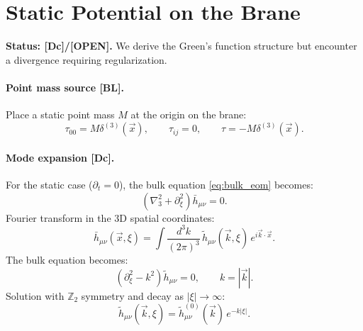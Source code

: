 \documentclass[11pt,a4paper]{article}
\newcommand{\tagBL}{\textcolor{blue!70!black}{[BL]}}
\newcommand{\tagOPEN}{\textcolor{red!70!black}{[OPEN]}}
\newcommand{\tagDc}{\textcolor{purple!70!black}{[Dc]}}
\begin{document}
\section{Static Potential on the Brane}
\label{sec:potential}

\begin{statusbox}
\textbf{Status: \tagDc{}/\tagOPEN{}.}
We derive the Green's function structure but encounter a divergence requiring regularization.
\end{statusbox}

\paragraph{Point mass source \tagBL{}.}
Place a static point mass $M$ at the origin on the brane:
\begin{equation}
    \tau_{00} = M \delta^{(3)}(\vec{x}), \qquad \tau_{ij} = 0, \qquad \tau = -M \delta^{(3)}(\vec{x}).
    \label{eq:source}
\end{equation}

\paragraph{Mode expansion \tagDc{}.}
For the static case ($\partial_t = 0$), the bulk equation \eqref{eq:bulk_eom} becomes:
\begin{equation}
    \left( \nabla^2_3 + \partial_\xi^2 \right) \bar{h}_{\mu\nu} = 0.
    \label{eq:static_bulk}
\end{equation}
Fourier transform in the 3D spatial coordinates:
\begin{equation}
    \bar{h}_{\mu\nu}(\vec{x}, \xi) = \int \frac{d^3k}{(2\pi)^3} \, \tilde{h}_{\mu\nu}(\vec{k}, \xi) \, e^{i\vec{k}\cdot\vec{x}}.
\end{equation}
The bulk equation becomes:
\begin{equation}
    \left( \partial_\xi^2 - k^2 \right) \tilde{h}_{\mu\nu} = 0, \qquad k = |\vec{k}|.
    \label{eq:bulk_fourier}
\end{equation}
Solution with $\mathbb{Z}_2$ symmetry and decay as $|\xi| \to \infty$:
\begin{equation}
    \tilde{h}_{\mu\nu}(\vec{k}, \xi) = \tilde{h}_{\mu\nu}^{(0)}(\vec{k}) \, e^{-k|\xi|}.
    \label{eq:bulk_solution}
\end{equation}
\end{document}
